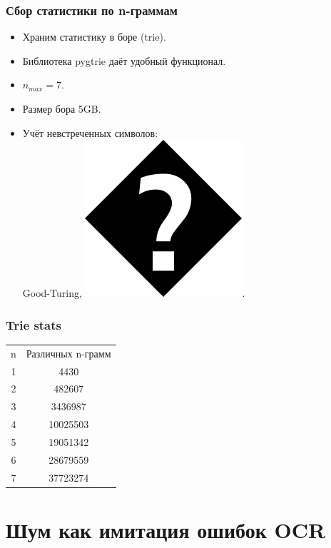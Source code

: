 \documentclass[14pt]{beamer}
\begin{document}
\begin{frame}
	\frametitle{Сбор статистики по n-граммам}
\begin{itemize}
	\item Храним статистику в боре (trie).
	\item Библиотека pygtrie даёт удобный функционал.
	\item $n_{max} = 7$.
	\item Размер бора 5GB.
	\item Учёт невстреченных символов: \\ Good-Turing, \includegraphics[scale=0.05]{fffd}.
\end{itemize}
\end{frame}

\begin{frame}
\frametitle{Trie stats}
\begin{center}
	\begin{tabular}{c|c}
		n	& Различных n-грамм \\ 
		1		&4430 \\
		2		&482607\\
		3		&3436987\\
		4		&10025503\\
		5		&19051342\\
		6		&28679559\\
		7		&37723274\\
	\end{tabular}
\end{center}
\end{frame}

\section{Шум как имитация ошибок OCR}
\end{document}
